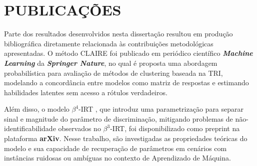 \section{PUBLICAÇÕES}

Parte dos resultados desenvolvidos nesta dissertação resultou em produção bibliográfica diretamente relacionada às contribuições metodológicas apresentadas. O método \gls{CLAIRE} \cite{ferreira2025claire} foi publicado em periódico científico \textit{\textbf{Machine Learning}} da \textit{\textbf{Springer Nature}}, no qual é proposta uma abordagem probabilística para avaliação de métodos de clustering baseada na \gls{TRI}, modelando a concordância entre modelos como matriz de respostas e estimando habilidades latentes sem acesso a rótulos verdadeiros.

Além disso, o modelo $\beta^4$-\gls{IRT} \cite{ferreirajunior2023beta4irtnewbeta3irtenhanced}, que introduz uma parametrização para separar sinal e magnitude do parâmetro de discriminação, mitigando problemas de não-identificabilidade observados no $\beta^3$-\gls{IRT}, foi disponibilizado como preprint na plataforma \textbf{arXiv}. Nesse trabalho, são investigadas as propriedades teóricas do modelo e sua capacidade de recuperação de parâmetros em cenários com instâncias ruidosas ou ambíguas no contexto de Aprendizado de Máquina.
